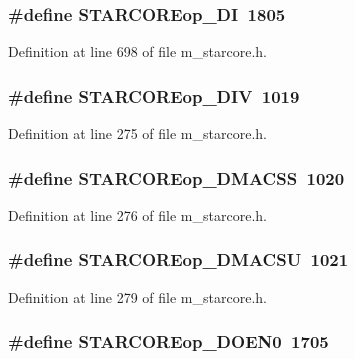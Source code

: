 \subsubsection{\setlength{\rightskip}{0pt plus 5cm}\#define STARCOREop\_\-DI~1805}\label{m__starcore_8h_ecdf88dd42702d5e14f9198db2e1e52d}




Definition at line 698 of file m\_\-starcore.h.
\subsubsection{\setlength{\rightskip}{0pt plus 5cm}\#define STARCOREop\_\-DIV~1019}\label{m__starcore_8h_1a4afa49c9818aa1c772232b301fffdc}




Definition at line 275 of file m\_\-starcore.h.
\subsubsection{\setlength{\rightskip}{0pt plus 5cm}\#define STARCOREop\_\-DMACSS~1020}\label{m__starcore_8h_e9f3572e59a36bb70dfe17b33356879a}




Definition at line 276 of file m\_\-starcore.h.
\subsubsection{\setlength{\rightskip}{0pt plus 5cm}\#define STARCOREop\_\-DMACSU~1021}\label{m__starcore_8h_f792746b3fa5eeacc1fd62a68614eef7}




Definition at line 279 of file m\_\-starcore.h.
\subsubsection{\setlength{\rightskip}{0pt plus 5cm}\#define STARCOREop\_\-DOEN0~1705}\label{m__starcore_8h_a3697b3c3db6301fa2eb273c5bfe7748}




